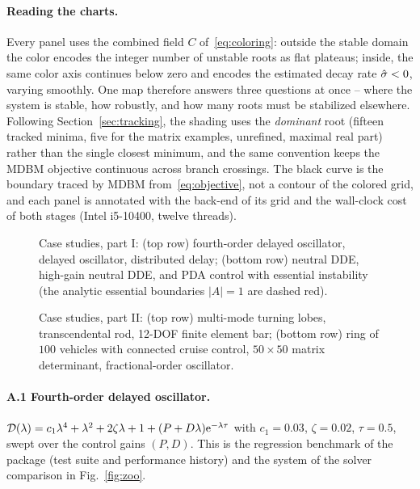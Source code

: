 \paragraph{Reading the charts.} Every panel uses the combined field $C$
of~\eqref{eq:coloring}: outside the stable domain the color encodes the
integer number of unstable roots as flat plateaus; inside, the same color
axis continues below zero and encodes the estimated decay rate $\hat{\sigma}<0$,
varying smoothly. One map therefore answers three questions at once --
where the system is stable, how robustly, and how many roots must be
stabilized elsewhere. Following Section~\ref{sec:tracking}, the shading uses
the \emph{dominant} root (fifteen tracked minima, five for the matrix
examples, unrefined, maximal real part) rather than the single closest
minimum, and the same convention keeps
the MDBM objective continuous across branch crossings. The black curve is
the boundary traced by MDBM from~\eqref{eq:objective}, not a contour of the
colored grid, and each panel is annotated with the back-end of its grid and
the wall-clock cost of both stages (Intel i5-10400, twelve threads).

\begin{figure}[tb]
  \centering
  \caption{Case studies, part I: (top row) fourth-order delayed
  oscillator, delayed oscillator, distributed delay; (bottom row) neutral
  DDE, high-gain neutral DDE, and PDA control with essential instability
  (the analytic essential boundaries $|A|=1$ are dashed
  red).}\label{fig:gallerya}
\end{figure}

\begin{figure}[tb]
  \centering
  \caption{Case studies, part II: (top row) multi-mode turning lobes,
  transcendental rod, 12-DOF finite element bar; (bottom row) ring of
  $100$ vehicles with connected cruise control, $50\times50$ matrix
  determinant, fractional-order oscillator.}\label{fig:galleryb}
\end{figure}

\paragraph{A.1 Fourth-order delayed oscillator.}
$\mathcal{D}(\lambda)=c_1\lambda^4+\lambda^2+2\zeta\lambda+1+(P+D\lambda)\mathrm{e}^{-\lambda\tau}$ with
$c_1=0.03$, $\zeta=0.02$, $\tau=0.5$, swept over the control gains
$(P,D)$. This is the regression benchmark of the package (test suite and
performance history) and the system of the solver comparison in
Fig.~\ref{fig:zoo}.

